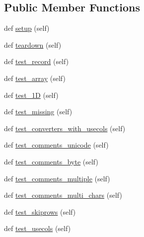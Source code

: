 \subsection*{Public Member Functions}
\begin{DoxyCompactItemize}
\item 
def \hyperlink{classnumpy_1_1lib_1_1tests_1_1test__io_1_1TestLoadTxt_a43d9b2b9afd14ee9fc55a88752542749}{setup} (self)
\item 
def \hyperlink{classnumpy_1_1lib_1_1tests_1_1test__io_1_1TestLoadTxt_abaafe2ddf370c128c810617dd33878d0}{teardown} (self)
\item 
def \hyperlink{classnumpy_1_1lib_1_1tests_1_1test__io_1_1TestLoadTxt_a25f8b32b9b72c591ddebfe8aeeecbe29}{test\+\_\+record} (self)
\item 
def \hyperlink{classnumpy_1_1lib_1_1tests_1_1test__io_1_1TestLoadTxt_a9af6a8a0d6aecacdc550cf7e40336c83}{test\+\_\+array} (self)
\item 
def \hyperlink{classnumpy_1_1lib_1_1tests_1_1test__io_1_1TestLoadTxt_a772fc4eb6de6afd14458d734379a0944}{test\+\_\+1D} (self)
\item 
def \hyperlink{classnumpy_1_1lib_1_1tests_1_1test__io_1_1TestLoadTxt_a89d355133f28d88d6b571479f2dcb4c3}{test\+\_\+missing} (self)
\item 
def \hyperlink{classnumpy_1_1lib_1_1tests_1_1test__io_1_1TestLoadTxt_a2e0a3010439700b98feec4ca86725ea9}{test\+\_\+converters\+\_\+with\+\_\+usecols} (self)
\item 
def \hyperlink{classnumpy_1_1lib_1_1tests_1_1test__io_1_1TestLoadTxt_ad6e23f2ae69f1b2212b1db2ac3bb14c2}{test\+\_\+comments\+\_\+unicode} (self)
\item 
def \hyperlink{classnumpy_1_1lib_1_1tests_1_1test__io_1_1TestLoadTxt_a58b223c9ea6aa4e46ece7f3fe23cdc9c}{test\+\_\+comments\+\_\+byte} (self)
\item 
def \hyperlink{classnumpy_1_1lib_1_1tests_1_1test__io_1_1TestLoadTxt_a3daea8a77e388c677cea74e1efc09e67}{test\+\_\+comments\+\_\+multiple} (self)
\item 
def \hyperlink{classnumpy_1_1lib_1_1tests_1_1test__io_1_1TestLoadTxt_aaee85baf40f184954883535bf60f9897}{test\+\_\+comments\+\_\+multi\+\_\+chars} (self)
\item 
def \hyperlink{classnumpy_1_1lib_1_1tests_1_1test__io_1_1TestLoadTxt_a64c2fbf8e5ebef31b9bfc396f18ba1f8}{test\+\_\+skiprows} (self)
\item 
def \hyperlink{classnumpy_1_1lib_1_1tests_1_1test__io_1_1TestLoadTxt_a456c04aad2aec36775a859b6eb366a4d}{test\+\_\+usecols} (self)

\end{DoxyCompactItemize}
